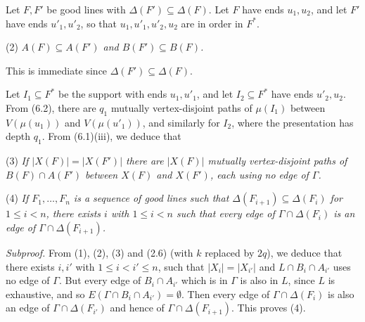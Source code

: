 Let $F, F'$ be good lines with $\Delta(F') \subseteq \Delta(F)$. Let $F$ have ends $u_1, u_2$, and let $F'$ have ends $u'_1, u'_2$, so that $u_1, u'_1, u'_2, u_2$ are in order in $F^*$.

\hspace*{12pt}(2) \textit{$A(F) \subseteq A(F')$ and $B(F') \subseteq B(F)$.}

This is immediate since $\Delta(F') \subseteq \Delta(F)$.

Let $I_1 \subseteq F^*$ be the support with ends $u_1, u'_1$, and let $I_2 \subseteq F^*$ have ends $u'_2, u_2$. From (6.2), there are $q_1$ mutually vertex-disjoint paths of $\mu(I_1)$ between $V(\mu(u_1))$ and $V(\mu(u'_1))$, and similarly for $I_2$, where the presentation has depth $q_1$. From (6.1)(iii), we deduce that

\hspace*{12pt}(3) \textit{If $|X(F)| = |X(F')|$ there are $|X(F)|$ mutually vertex-disjoint paths of $B(F) \cap A(F')$ between $X(F)$ and $X(F')$, each using no edge of $\Gamma$.}

\hspace*{12pt}(4) \textit{If $F_1, \ldots, F_n$ is a sequence of good lines such that $\Delta(F_{i+1}) \subseteq \Delta(F_i)$ for $1 \le i < n$, there exists $i$ with $1 \le i < n$ such that every edge of $\Gamma \cap \Delta(F_i)$ is an edge of $\Gamma \cap \Delta(F_{i+1})$.}

\textit{Subproof.} From (1), (2), (3) and (2.6) (with $k$ replaced by $2q$), we deduce that there exists $i, i'$ with $1 \le i < i' \le n$, such that $|X_i| = |X_{i'}|$ and $L \cap B_i \cap A_{i'}$ uses no edge of $\Gamma$. But every edge of $B_i \cap A_{i'}$ which is in $\Gamma$ is also in $L$, since $L$ is exhaustive, and so $E(\Gamma \cap B_i \cap A_{i'}) = \emptyset$. Then every edge of $\Gamma \cap \Delta(F_i)$ is also an edge of $\Gamma \cap \Delta(F_{i'})$ and hence of $\Gamma \cap \Delta(F_{i+1})$. This proves (4).

